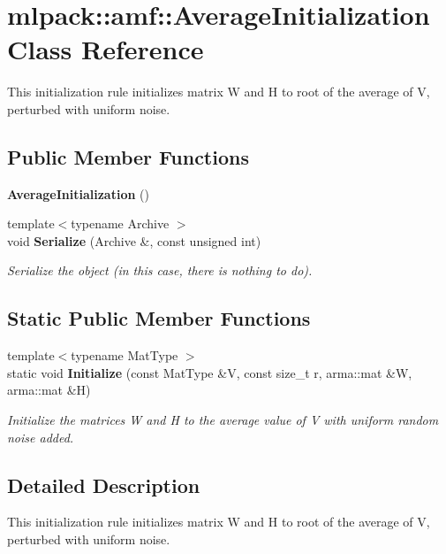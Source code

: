 \section{mlpack\+:\+:amf\+:\+:Average\+Initialization Class Reference}
\label{classmlpack_1_1amf_1_1AverageInitialization}


This initialization rule initializes matrix W and H to root of the average of V, perturbed with uniform noise.  


\subsection*{Public Member Functions}
\begin{DoxyCompactItemize}
\item 
{\bf Average\+Initialization} ()
\item 
{\footnotesize template$<$typename Archive $>$ }\\void {\bf Serialize} (Archive \&, const unsigned int)
\begin{DoxyCompactList}\small\item\em Serialize the object (in this case, there is nothing to do). \end{DoxyCompactList}\end{DoxyCompactItemize}
\subsection*{Static Public Member Functions}
\begin{DoxyCompactItemize}
\item 
{\footnotesize template$<$typename Mat\+Type $>$ }\\static void {\bf Initialize} (const Mat\+Type \&V, const size\+\_\+t r, arma\+::mat \&W, arma\+::mat \&H)
\begin{DoxyCompactList}\small\item\em Initialize the matrices W and H to the average value of V with uniform random noise added. \end{DoxyCompactList}\end{DoxyCompactItemize}


\subsection{Detailed Description}
This initialization rule initializes matrix W and H to root of the average of V, perturbed with uniform noise. 

